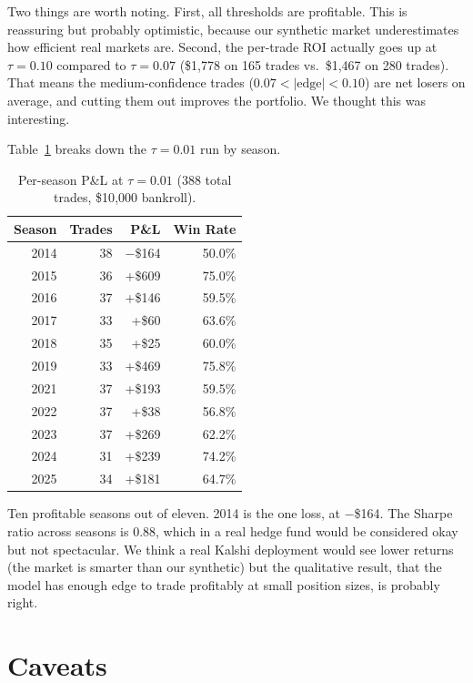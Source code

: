 \documentclass[11pt,a4paper]{article}
\begin{document}
Two things are worth noting. First, all thresholds are profitable. This is reassuring but probably optimistic, because our synthetic market underestimates how efficient real markets are. Second, the per-trade ROI actually goes up at $\tau = 0.10$ compared to $\tau = 0.07$ (\$1{,}778 on 165 trades vs.\ \$1{,}467 on 280 trades). That means the medium-confidence trades ($0.07 < |\text{edge}| < 0.10$) are net losers on average, and cutting them out improves the portfolio. We thought this was interesting.

Table~\ref{tab:seasons} breaks down the $\tau = 0.01$ run by season.

\begin{table}[h]
\centering
\caption{Per-season P\&L at $\tau = 0.01$ (388 total trades, \$10{,}000 bankroll).}
\label{tab:seasons}
\small
\begin{tabular}{@{}rrrr@{}}
\toprule
Season & Trades & P\&L & Win Rate \\
\midrule
2014 & 38 & $-$\$164 & 50.0\% \\
2015 & 36 & +\$609 & 75.0\% \\
2016 & 37 & +\$146 & 59.5\% \\
2017 & 33 & +\$60 & 63.6\% \\
2018 & 35 & +\$25 & 60.0\% \\
2019 & 33 & +\$469 & 75.8\% \\
2021 & 37 & +\$193 & 59.5\% \\
2022 & 37 & +\$38 & 56.8\% \\
2023 & 37 & +\$269 & 62.2\% \\
2024 & 31 & +\$239 & 74.2\% \\
2025 & 34 & +\$181 & 64.7\% \\
\bottomrule
\end{tabular}
\end{table}

Ten profitable seasons out of eleven. 2014 is the one loss, at $-$\$164. The Sharpe ratio across seasons is 0.88, which in a real hedge fund would be considered okay but not spectacular. We think a real Kalshi deployment would see lower returns (the market is smarter than our synthetic) but the qualitative result, that the model has enough edge to trade profitably at small position sizes, is probably right.


\section{Caveats}
\end{document}
